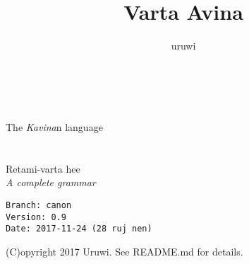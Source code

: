 \documentclass{book}
\title{Varta Avina}
\author{uruwi}
\begin{document}
\pagecolor{ForestGreen!25}

\begin{titlepage}
    \makeatletter
    \begin{center}
        {\color{BlueGreen} \hprule \vspace{1.5ex} \\}
        {\huge\sffamily \textcolor{PineGreen}{\@title} \\}
        {\large The \textit{Kavina}n language \\}
        {\color{BlueGreen} \hprule \vspace{1.5ex} \\}
        \vspace{1.5cm}
        {\Large\bfseries \@author}\\[5pt]
        \vspace{2cm}
        {Retami-varta hee} \\[5pt]
        \emph{A complete grammar}\\[2cm]
        \vfill
        \vfill
        {\@date}
    \end{center}
    \makeatother
\end{titlepage}

\pagecolor{ForestGreen!15}

\begin{verbatim}
Branch: canon
Version: 0.9
Date: 2017-11-24 (28 ruj nen)
\end{verbatim}

(C)opyright 2017 Uruwi. See README.md for details.
\end{document}
